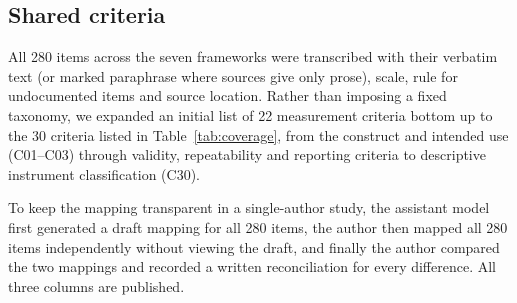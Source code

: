 \documentclass[10pt,conference]{IEEEtran}
\begin{document}
\subsection{Shared criteria}
All 280 items across the seven frameworks were transcribed with their verbatim text (or marked paraphrase where sources give only prose), scale, rule for undocumented items and source location. Rather than imposing a fixed taxonomy, we expanded an initial list of 22 measurement criteria \cite{aera_apa_ncme_standards_2014,kane_validation,efpa_test_review_model_2025} bottom up to the 30 criteria listed in Table~\ref{tab:coverage}, from the construct and intended use (C01--C03) through validity, repeatability and reporting criteria to descriptive instrument classification (C30).

To keep the mapping transparent in a single-author study, the assistant model first generated a draft mapping for all 280 items, the author then mapped all 280 items independently without viewing the draft, and finally the author compared the two mappings and recorded a written reconciliation for every difference. All three columns are published.
\end{document}
